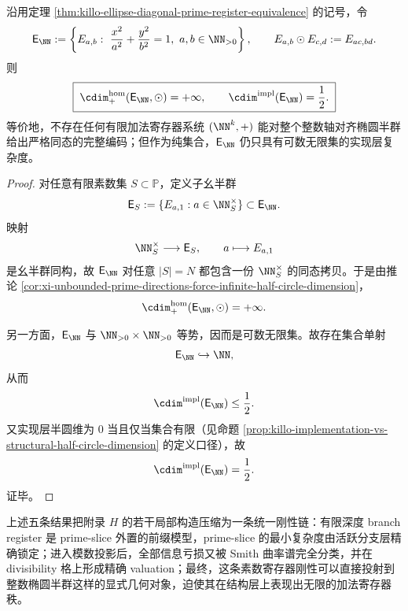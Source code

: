 \begin{theorem}\label{thm:xi-integer-ellipse-half-circle-dimension-gap}
沿用定理 \ref{thm:killo-ellipse-diagonal-prime-register-equivalence} 的记号，令
\[
\mathsf E_{\NN}
:=
\left\{
E_{a,b}:\ \frac{x^2}{a^2}+\frac{y^2}{b^2}=1,\ a,b\in\NN_{>0}
\right\},
\qquad
E_{a,b}\odot E_{c,d}:=E_{ac,bd}.
\]
则
\[
\boxed{\;
\cdim^{\mathrm{hom}}_{+}(\mathsf E_{\NN},\odot)=+\infty,
\qquad
\cdim^{\mathrm{impl}}(\mathsf E_{\NN})=\frac12.\;}
\]
等价地，不存在任何有限加法寄存器系统 \((\NN^k,+)\) 能对整个整数轴对齐椭圆半群给出严格同态的完整编码；但作为纯集合，\(\mathsf E_{\NN}\) 仍只具有可数无限集的实现层复杂度。
\end{theorem}
\begin{proof}
对任意有限素数集 \(S\subset\mathbb P\)，定义子幺半群
\[
\mathsf E_S:=\{E_{a,1}:a\in \NN_S^\times\}\subset \mathsf E_{\NN}.
\]
映射
\[
\NN_S^\times\longrightarrow \mathsf E_S,\qquad a\longmapsto E_{a,1}
\]
是幺半群同构，故 \(\mathsf E_{\NN}\) 对任意 \(|S|=N\) 都包含一份 \(\NN_S^\times\) 的同态拷贝。于是由推论 \ref{cor:xi-unbounded-prime-directions-force-infinite-half-circle-dimension}，
\[
\cdim^{\mathrm{hom}}_{+}(\mathsf E_{\NN},\odot)=+\infty.
\]

另一方面，\(\mathsf E_{\NN}\) 与 \(\NN_{>0}\times \NN_{>0}\) 等势，因而是可数无限集。故存在集合单射
\[
\mathsf E_{\NN}\hookrightarrow \NN,
\]
从而
\[
\cdim^{\mathrm{impl}}(\mathsf E_{\NN})\le \frac12.
\]
又实现层半圆维为 \(0\) 当且仅当集合有限（见命题 \ref{prop:killo-implementation-vs-structural-half-circle-dimension} 的定义口径），故
\[
\cdim^{\mathrm{impl}}(\mathsf E_{\NN})=\frac12.
\]
证毕。
\end{proof}

\noindent
上述五条结果把附录 \(H\) 的若干局部构造压缩为一条统一刚性链：有限深度 branch register 是 prime-slice 外置的前缀模型，prime-slice 的最小复杂度由活跃分支层精确锁定；进入模数投影后，全部信息亏损又被 Smith 曲率谱完全分类，并在 divisibility 格上形成精确 valuation；最终，这条素数寄存器刚性可以直接投射到整数椭圆半群这样的显式几何对象，迫使其在结构层上表现出无限的加法寄存器秩。

\endinput
